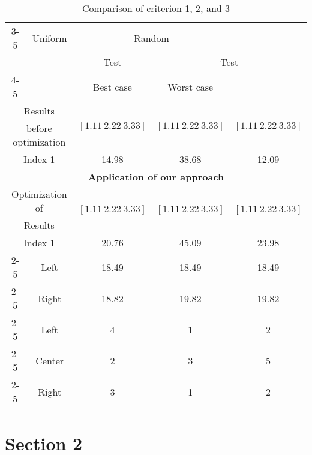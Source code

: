 \begin{table*}[!h]
	\centering
	\caption{Comparison of criterion 1, 2, and 3}
		\begin{tabular}{|c|c|c|c|c|}
			\cline{3-5}
			\multicolumn{2}{c|}{}  & Uniform & \multicolumn{2}{|c|}{Random} \\
			\multicolumn{2}{c|}{}  & Test &  \multicolumn{2}{|c|}{Test} \\
			\cline{4-5}
			\multicolumn{2}{c|}{}  & & Best case & Worst case \\
			\hline
			\multicolumn{2}{|c|}{Results} & \multirow{2}{*}{$[1.11~2.22~3.33]$}  & \multirow{2}{*}{$[1.11~2.22~3.33]$} & \multirow{2}{*}{$[1.11~2.22~3.33]$} \\
			\multicolumn{2}{|c|}{before optimization} &  &  & \\
			\hline
			\multicolumn{2}{|c|}{Index 1} & 14.98 & 38.68 & 12.09 \\
			\hline
			\multicolumn{5}{|c|}{\textbf{Application of our approach}}  \\
			\hline
			\multicolumn{2}{|c|}{Optimization of} & \multirow{2}{*}{$[1.11~2.22~3.33]$} & \multirow{2}{*}{$[1.11~2.22~3.33]$} & \multirow{2}{*}{$[1.11~2.22~3.33]$}\\
			\multicolumn{2}{|c|}{Results} & & & \\
			\hline
			\multicolumn{2}{|c|}{Index 1}  & 20.76 & 45.09 & 23.98 \\
			\hline
			\cline{2-5}
			\multicolumn{1}{|c|}{\multirow{2}{*}{Index 2} }& Left & 18.49 & 18.49 & 18.49\\
			\cline{2-5}
			& Right & 18.82 & 19.82 & 19.82\\
			\cline{2-5}
			\hline
			\multicolumn{1}{|c|}{\multirow{3}{*}{Index 3} } & Left & 4 & 1 & 2 \\
			\cline{2-5}
			& Center & 2 & 3 & 5 \\
			\cline{2-5}
			& Right & 3 & 1 & 2\\
			\hline
		\end{tabular}
		\label{TabTest2}
\end{table*}

\section{Section 2} %

